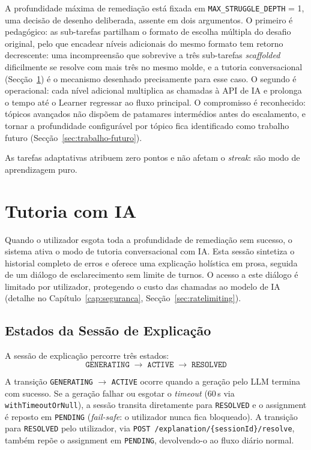 A profundidade máxima de remediação está fixada em \texttt{MAX\_STRUGGLE\_DEPTH} = 1, uma decisão de desenho deliberada, assente em dois argumentos. O primeiro é pedagógico: as sub-tarefas partilham o formato de escolha múltipla do desafio original, pelo que encadear níveis adicionais do mesmo formato tem retorno decrescente: uma incompreensão que sobrevive a três sub-tarefas \textit{scaffolded} dificilmente se resolve com mais três no mesmo molde, e a tutoria conversacional (Secção~\ref{sec:explicacao-ia}) é o mecanismo desenhado precisamente para esse caso. O segundo é operacional: cada nível adicional multiplica as chamadas à API de IA e prolonga o tempo até o Learner regressar ao fluxo principal. O compromisso é reconhecido: tópicos avançados não dispõem de patamares intermédios antes do escalamento, e tornar a profundidade configurável por tópico fica identificado como trabalho futuro (Secção~\ref{sec:trabalho-futuro}).

As tarefas adaptativas atribuem zero pontos e não afetam o \textit{streak}: são modo de aprendizagem puro.

\section{Tutoria com IA} \label{sec:explicacao-ia}

Quando o utilizador esgota toda a profundidade de remediação sem sucesso, o sistema ativa o modo de tutoria conversacional com IA.
Esta sessão sintetiza o historial completo de erros e oferece uma explicação holística em prosa, seguida de um diálogo de esclarecimento sem limite de turnos. O acesso a este diálogo é limitado por utilizador, protegendo o custo das chamadas ao modelo de IA (detalhe no Capítulo~\ref{cap:seguranca}, Secção~\ref{sec:ratelimiting}).

\subsection*{Estados da Sessão de Explicação}

A sessão de explicação percorre três estados:
\[
\texttt{GENERATING} \;\to\; \texttt{ACTIVE} \;\to\; \texttt{RESOLVED}
\]

A transição \texttt{GENERATING} $\to$ \texttt{ACTIVE} ocorre quando a geração pelo LLM termina com sucesso.
Se a geração falhar ou esgotar o \textit{timeout} (60\,s via \texttt{withTimeoutOrNull}), a sessão transita diretamente para \texttt{RESOLVED} e o assignment é reposto em \texttt{PENDING} (\textit{fail-safe}: o utilizador nunca fica bloqueado).
A transição para \texttt{RESOLVED} pelo utilizador, via \texttt{POST /explanation/\{sessionId\}/resolve}, também repõe o assignment em \texttt{PENDING}, devolvendo-o ao fluxo diário normal.

